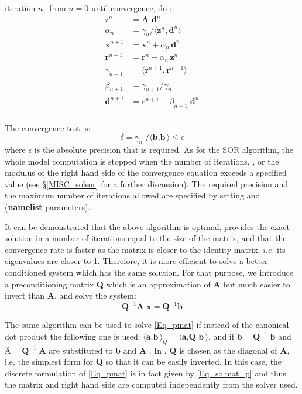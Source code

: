 iteration $n,$ from $n=0$ until convergence, do :
\begin{equation} 
\begin{split}
\text{z}^n& = \textbf{A d}^n \\
\alpha_n &= \gamma_n /  \langle{ \textbf{z}^n , \textbf{d}^n} \rangle \\
\textbf{x}^{n+1} &= \textbf{x}^n + \alpha_n \,\textbf{d}^n \\
\textbf{r}^{n+1} &= \textbf{r}^n - \alpha_n \,\textbf{z}^n \\
\gamma_{n+1} &= \langle{ \textbf{r}^{n+1} , \textbf{r}^{n+1}} \rangle \\
\beta_{n+1} &= \gamma_{n+1}/\gamma_{n}  \\
\textbf{d}^{n+1} &= \textbf{r}^{n+1} + \beta_{n+1}\; \textbf{d}^{n}\\
\end{split}
\end{equation}


The convergence test is:
\begin{equation}
\delta = \gamma_{n}\; / \langle{ \textbf{b} , \textbf{b}} \rangle \leq \epsilon
\end{equation}
where $\epsilon $ is the absolute precision that is required. As for the SOR algorithm, 
the whole model computation is stopped when the number of iterations, , or 
the modulus of the right hand side of the convergence equation exceeds a 
specified value (see \S\ref{MISC_solsor} for a further discussion). The required 
precision and the maximum number of iterations allowed are specified by setting 
 and  (\textbf{namelist} parameters).

It can be demonstrated that the above algorithm is optimal, provides the exact 
solution in a number of iterations equal to the size of the matrix, and that 
the convergence rate is faster as the matrix is closer to the identity matrix,
$i.e.$ its eigenvalues are closer to 1. Therefore, it is more efficient to solve 
a better conditioned system which has the same solution. For that purpose, 
we introduce a preconditioning matrix \textbf{Q} which is an approximation 
of \textbf{A} but much easier to invert than \textbf{A}, and solve the system:
\begin{equation} \label{Eq_pmat}
\textbf{Q}^{-1} \textbf{A x} = \textbf{Q}^{-1} \textbf{b}
\end{equation}

The same algorithm can be used to solve \eqref{Eq_pmat} if instead of the 
canonical dot product the following one is used: 
${\langle{ \textbf{a} , \textbf{b}} \rangle}_Q = \langle{ \textbf{a} , \textbf{Q b}} \rangle$, and 
if $\textbf{\~{b}} = \textbf{Q}^{-1}\;\textbf{b}$ and $\textbf{\~{A}} = \textbf{Q}^{-1}\;\textbf{A}$ 
are substituted to \textbf{b} and \textbf{A} \citep{Madec_al_OM88}. 
In \NEMO, \textbf{Q} is chosen as the diagonal of \textbf{ A}, i.e. the simplest form for 
\textbf{Q} so that it can be easily inverted. In this case, the discrete formulation of 
\eqref{Eq_pmat} is in fact given by \eqref{Eq_solmat_p} and thus the matrix and 
right hand side are computed independently from the solver used.














